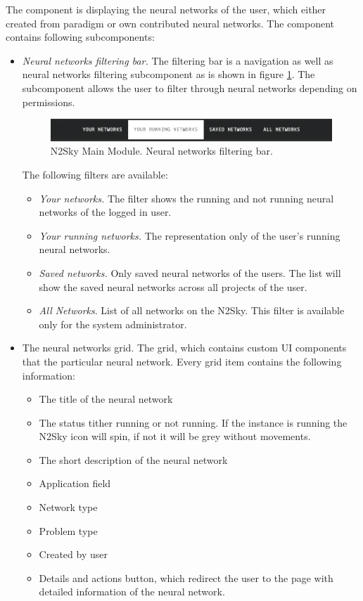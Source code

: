  The component is displaying the neural networks of the user, which either created from paradigm or own contributed neural networks. The component contains following subcomponents:
 \begin{itemize}
\item \emph{Neural networks filtering bar.}
The filtering bar is a navigation as well as neural networks filtering subcomponent as is shown in figure \ref{fig:n2sky_filtering_bar}. The subcomponent allows the user to filter through neural networks depending on permissions. 

\begin{figure}[htbp]
\begin{center}
  \includegraphics[scale=0.5]{components/5/img/n2sky_filtering_bar.png}
  \caption{N2Sky Main Module. Neural networks filtering bar.}
  \label{fig:n2sky_filtering_bar}
\end{center}
\end{figure}

The following filters are available: 
\begin{itemize}
\item \emph{Your networks.} The filter shows the running and not running neural networks of the logged in user. 
\item \emph{Your running networks.} The representation only of the user's running neural networks.
\item \emph{Saved networks.} Only saved neural networks of the users. The list will show the saved neural networks across all projects of the user.
\item \emph{All Networks}. List of all networks on the N2Sky. This filter is available only for the system administrator.
\end{itemize}
\item{The neural networks grid.} The grid, which contains custom UI components that the particular neural network. Every grid item contains the following information:
\begin{itemize}
\item The title of the neural network
\item The status tither running or not running. If the instance is running the N2Sky icon will spin, if not it will be grey without movements. 
\item The short description of the neural network
\item Application field
\item Network type
\item Problem type
\item Created by user
\item Details and actions button, which redirect the user to the page with detailed information of the neural network. 
\end{itemize}


\end{itemize}
